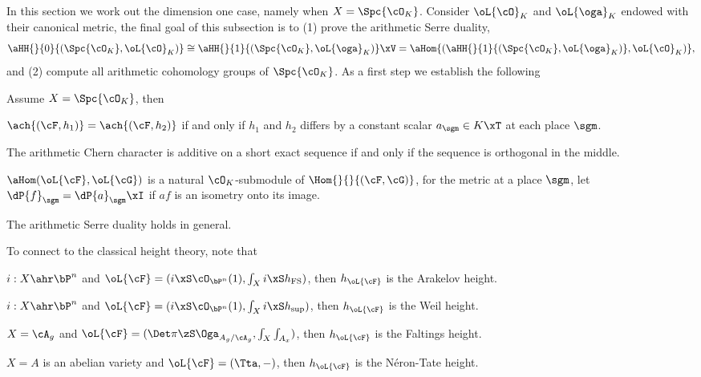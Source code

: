 \documentclass[a4paper, twoside]{article}
\begin{document}
\begin{prf}
\end{prf}



In this section we work out the dimension one case, namely when $X=\Spc{\cO_{K}}$. Consider $\oL{\cO}_{K}$ and $\oL{\oga}_{K}$ endowed with their canonical metric, the final goal of this subsection is to (1) prove the arithmetic Serre duality,
\[
	\aHH{}{0}{(\Spc{\cO_{K}},\oL{\cO}_{K})}\cong\aHH{}{1}{(\Spc{\cO_{K}},\oL{\oga}_{K})}\xV=\aHom{(\aHH{}{1}{(\Spc{\cO_{K}},\oL{\oga}_{K})},\oL{\cO}_{K})},
\]
and (2) compute all arithmetic cohomology groups of $\Spc{\cO_{K}}$. As a first step we establish the following
\begin{thm}
	Assume $X=\Spc{\cO_{K}}$, then
	\begin{itm}
		\item $\ach{(\cF,h_{1})}=\ach{(\cF,h_{2})}$ if and only if $h_{1}$ and $h_{2}$ differs by a constant scalar $a_{\sgm}\in K\xT$ at each place $\sgm$.
		\item The arithmetic Chern character is additive on a short exact sequence if and only if the sequence is orthogonal in the middle.
		\item $\aHom(\oL{\cF},\oL{\cG})$ is a natural $\cO_{K}$-submodule of $\Hom{}{}{(\cF,\cG)}$, for the metric at a place $\sgm$, let $\dP{f}_{\sgm}=\dP{a}_{\sgm}\xI$ if $af$ is an isometry onto its image.
	\end{itm}
\end{thm}

\begin{prf}
\end{prf}

\begin{thm}
	The arithmetic Serre duality holds in general.
\end{thm}



\begin{prp}
	To connect to the classical height theory, note that
	\begin{enr}
		\item $i:X\ahr\bP^{n}$ and $\oL{\cF}=(i\xS\cO_{\bP^{n}}(1),\int_{X}i\xS h_{\mathrm{FS}})$, then $h_{\oL{\cF}}$ is the Arakelov height.
		\item $i:X\ahr\bP^{n}$ and $\oL{\cF}=(i\xS\cO_{\bP^{n}}(1),\int_{X}i\xS h_{\mathrm{sup}})$, then $h_{\oL{\cF}}$ is the Weil height.
		\item $X=\cA_{g}$ and $\oL{\cF}=(\Det\pi\zS\Oga_{A_{g}/\cA_{g}},\int_{X}\int_{A_{x}})$, then $h_{\oL{\cF}}$ is the Faltings height.
		\item $X=A$ is an abelian variety and $\oL{\cF}=(\Tta,-)$, then $h_{\oL{\cF}}$ is the N{\'e}ron-Tate height.
	\end{enr}
\end{prp}
\end{document}
